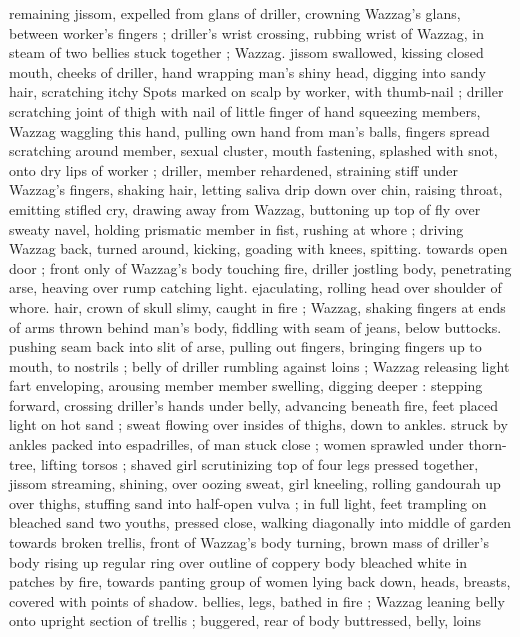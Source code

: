 remaining jissom, expelled from glans of driller, crowning Wazzag's 
glans, between worker's fingers ; driller's wrist crossing, rubbing 
wrist of Wazzag, in steam of two bellies stuck together ; Wazzag. 
jissom swallowed, kissing closed mouth, cheeks of driller, hand 
wrapping man's shiny head, digging into sandy hair, scratching itchy 
Spots marked on scalp by worker, with thumb-nail ; driller scratching 
joint of thigh with nail of little finger of hand squeezing members, 
Wazzag waggling this hand, pulling own hand from man's balls, 
fingers spread scratching around member, sexual cluster, mouth 
fastening, splashed with snot, onto dry lips of worker ; driller, 
member rehardened, straining stiff under Wazzag's fingers, shaking 
hair, letting saliva drip down over chin, raising throat, emitting stifled 
cry, drawing away from Wazzag, buttoning up top of fly over sweaty 
navel, holding prismatic member in fist, rushing at whore ; driving 
Wazzag back, turned around, kicking, goading with knees, spitting. 
towards open door ; front only of Wazzag's body touching fire, driller 
jostling body, penetrating arse, heaving over rump catching light. 
ejaculating, rolling head over shoulder of whore. hair, crown of skull 
slimy, caught in fire ; Wazzag, shaking fingers at ends of arms thrown 
behind man's body, fiddling with seam of jeans, below buttocks. 
pushing seam back into slit of arse, pulling out fingers, bringing 
fingers up to mouth, to nostrils ; belly of driller rumbling against 
loins ; Wazzag releasing light fart enveloping, arousing member 
member swelling, digging deeper : stepping forward, crossing 
driller's hands under belly, advancing beneath fire, feet placed light 
on hot sand ; sweat flowing over insides of thighs, down to ankles. 
struck by ankles packed into espadrilles, of man stuck close ; women 
sprawled under thorn-tree, lifting torsos ; shaved girl scrutinizing top 
of four legs pressed together, jissom streaming, shining, over oozing 
sweat, girl kneeling, rolling gandourah up over thighs, stuffing sand 
into half-open vulva ; in full light, feet trampling on bleached sand 
two youths, pressed close, walking diagonally into middle of garden 
towards broken trellis, front of Wazzag's body turning, brown mass 
of driller's body rising up regular ring over outline of coppery body 
bleached white in patches by fire, towards panting group of women 
lying back down, heads, breasts, covered with points of shadow. 
bellies, legs, bathed in fire ; Wazzag leaning belly onto upright 
section of trellis ; buggered, rear of body buttressed, belly, loins 
